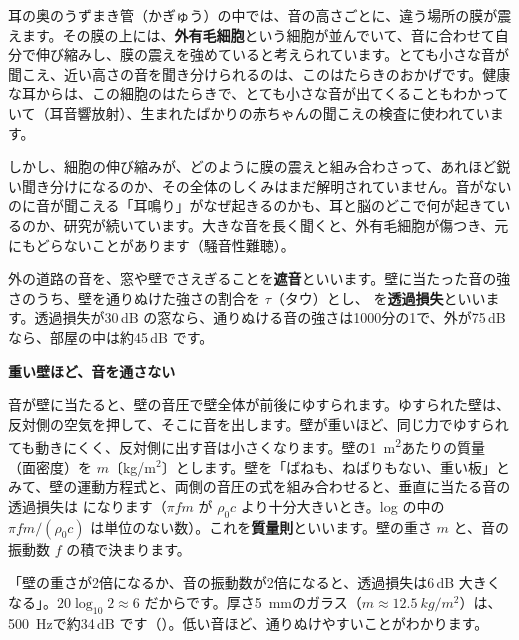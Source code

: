 \begin{phmada}
耳の奥のうずまき管（かぎゅう）の中では、音の高さごとに、違う場所の膜が震えます。その膜の上には、\textbf{外有毛細胞}という細胞が並んでいて、音に合わせて自分で伸び縮みし、膜の震えを強めていると考えられています。とても小さな音が聞こえ、近い高さの音を聞き分けられるのは、このはたらきのおかげです。健康な耳からは、この細胞のはたらきで、とても小さな音が出てくることもわかっていて（耳音響放射）、生まれたばかりの赤ちゃんの聞こえの検査に使われています。

しかし、細胞の伸び縮みが、どのように膜の震えと組み合わさって、あれほど鋭い聞き分けになるのか、その全体のしくみはまだ解明されていません。音がないのに音が聞こえる「耳鳴り」がなぜ起きるのかも、耳と脳のどこで何が起きているのか、研究が続いています。大きな音を長く聞くと、外有毛細胞が傷つき、元にもどらないことがあります（騒音性難聴）。
\end{phmada}


\leavevmode\label{ph:波-9:sec9}外の道路の音を、窓や壁でさえぎることを\textbf{遮音}といいます。壁に当たった音の強さのうち、壁を通りぬけた強さの割合を $\tau$（タウ）とし、
を\textbf{透過損失}といいます。透過損失が30\,dB の窓なら、通りぬける音の強さは1000分の1で、外が75\,dB なら、部屋の中は約45\,dB です。

\noindent\textbf{重い壁ほど、音を通さない}\par\nobreak
音が壁に当たると、壁の音圧で壁全体が前後にゆすられます。ゆすられた壁は、反対側の空気を押して、そこに音を出します。壁が重いほど、同じ力でゆすられても動きにくく、反対側に出す音は小さくなります。壁の\qty{1}{m^2}あたりの質量（面密度）を $m$〔kg/m$^2$〕とします。壁を「ばねも、ねばりもない、重い板」とみて、壁の運動方程式と、両側の音圧の式を組み合わせると、垂直に当たる音の透過損失は
\label{ph:波-9:shitsuryo}になります（$\pi fm$ が $\rho_0c$ より十分大きいとき。log の中の $\pi fm/(\rho_0c)$ は単位のない数）。これを\textbf{質量則}といいます。壁の重さ $m$ と、音の振動数 $f$ の積で決まります。

\begin{phyomi}[質量則]
「壁の重さが2倍になるか、音の振動数が2倍になると、透過損失は6\,dB 大きくなる」。$20\log_{10}2\approx6$ だからです。厚さ\qty{5}{mm}のガラス（$m\approx\qty{12.5}{kg/m^2}$）は、\qty{500}{Hz}で約34\,dB です（）。低い音ほど、通りぬけやすいことがわかります。
\end{phyomi}


